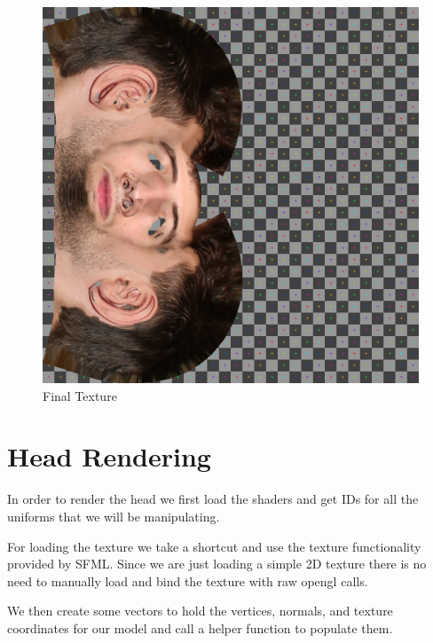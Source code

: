 \documentclass{article}
\newcommand{\mylisting}[3]{
    
}
\begin{document}
\begin{figure}[H]
    \centering
    \includegraphics[width=\linewidth]{../assets/uvmap.png}
    \caption{Final Texture}
\end{figure}



\newpage
\section*{Head Rendering}

In order to render the head we first load the shaders and get IDs for
all the uniforms that we will be manipulating.

\mylisting{../code/head.cpp}{21-27}{Load Shader}

For loading the texture we take a shortcut and use the texture functionality
provided by SFML. Since we are just loading a simple 2D texture there is no
need to manually load and bind the texture with raw opengl calls.

\mylisting{../code/head.cpp}{29-29}{Load Texture}


We then create some vectors to hold the vertices, normals, and texture coordinates
for our model and call a helper function to populate them.

\mylisting{../code/head.cpp}{32-35}{Read OBJ}
\end{document}
